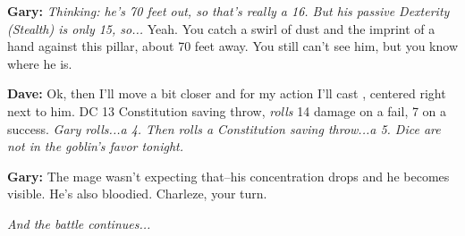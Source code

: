 \textbf{Gary:} \textit{Thinking: he's 70 feet out, so that's really a 16. But his passive Dexterity (Stealth) is only 15, so...} Yeah. You catch a swirl of dust and the imprint of a hand against this pillar, about 70 feet away. You still can't see him, but you know where he is.

\textbf{Dave:} Ok, then I'll move a bit closer and for my action I'll cast , centered right next to him. DC 13 Constitution saving throw, \textit{rolls} 14 damage on a fail, 7 on a success. \textit{Gary rolls...a 4. Then rolls a Constitution saving throw...a 5. Dice are not in the goblin's favor tonight.}

\textbf{Gary:} The mage wasn't expecting that--his concentration drops and he becomes visible. He's also bloodied. Charleze, your turn.

\textit{And the battle continues...}
